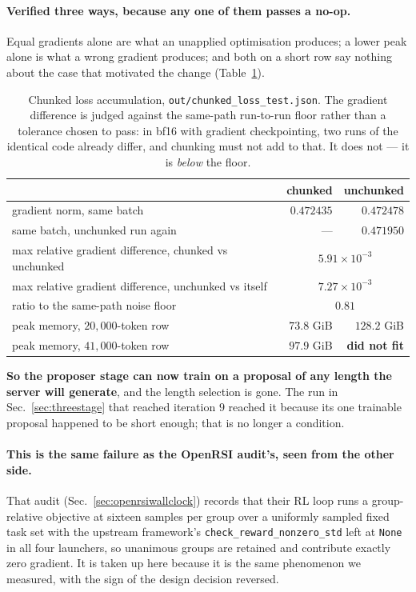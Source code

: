 \paragraph{Verified three ways, because any one of them passes a no-op.} Equal gradients alone
are what an unapplied optimisation produces; a lower peak alone is what a wrong gradient
produces; and both on a short row say nothing about the case that motivated the change
(Table~\ref{tab:chunked}).

\begin{table}[t]
\centering\small
\caption{Chunked loss accumulation, \texttt{out/chunked\_loss\_test.json}. The gradient
difference is judged against the same-path run-to-run floor rather than a tolerance chosen to
pass: in bf16 with gradient checkpointing, two runs of the identical code already differ, and
chunking must not add to that. It does not --- it is \emph{below} the floor.}
\label{tab:chunked}
\begin{tabular}{lrr}
\toprule
& chunked & unchunked \\
\midrule
gradient norm, same batch & $0.472435$ & $0.472478$ \\
same batch, unchunked run again & --- & $0.471950$ \\
\midrule
max relative gradient difference, chunked vs unchunked & \multicolumn{2}{c}{$5.91\times10^{-3}$} \\
max relative gradient difference, unchunked vs itself & \multicolumn{2}{c}{$7.27\times10^{-3}$} \\
ratio to the same-path noise floor & \multicolumn{2}{c}{$\mathbf{0.81}$} \\
\midrule
peak memory, $20{,}000$-token row & $\mathbf{73.8}$ GiB & $128.2$ GiB \\
peak memory, $41{,}000$-token row & $\mathbf{97.9}$ GiB & \textbf{did not fit} \\
\bottomrule
\end{tabular}
\end{table}

\textbf{So the proposer stage can now train on a proposal of any length the server will
generate}, and the length selection is gone. The run in
Sec.~\ref{sec:threestage} that reached iteration $9$ reached it because its one trainable
proposal happened to be short enough; that is no longer a condition.

\paragraph{This is the same failure as the OpenRSI audit's, seen from the other side.} That
audit (Sec.~\ref{sec:openrsiwallclock}) records that their RL loop runs a group-relative
objective at sixteen samples per group over a uniformly sampled fixed task set with the
upstream framework's \texttt{check\_reward\_nonzero\_std} left at \texttt{None} in all four
launchers, so unanimous groups are retained and contribute exactly zero gradient. It is taken
up here because it is the same phenomenon we measured, with the sign of the design decision
reversed.


